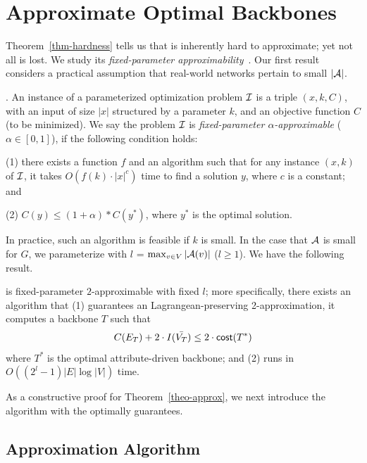 \vspace{-1ex}
\section{Approximate Optimal Backbones}
\label{sec-approx}

Theorem~\ref{thm-hardness} tells us that
\abd is inherently hard to approximate; yet
not all is lost. We
study its {\em fixed-parameter approximability}~\cite{marx2008parameterized}.
Our first result considers a practical
assumption that real-world networks pertain to
small $|\A|$.

.
An instance of a parameterized
optimization problem ${\cal I}$ is a triple $(x, k, C)$,
with an input of size $|x|$ structured by a parameter $k$, and an objective function $C$ (to be minimized).
We say the problem 
${\cal I}$ is {\em fixed-parameter $\alpha$-approximable} ($\alpha\in[0,1]$), if the following condition holds:

\sstab
(1) there exists a function $f$ and an algorithm such that for any instance $(x,k)$ of ${\cal I}$,
it takes $O(f(k)\cdot|x|^c)$ time to
find a solution $y$, where $c$ is a constant; and

\sstab
(2) $C(y)\leq (1+\alpha) * C(y^*)$,
where $y^*$ is the optimal solution.

\vspace{.5ex}
In practice, such an algorithm is feasible if
$k$ is small. In the case that
$\A$ is small
for $G$, we parameterize \abd with
$l$ = $\max_{v\in V}|\A(v)|$ ($l\geq 1$).
We have the following result.


\begin{theorem}
\label{theo-approx}
\abd is fixed-parameter $2$-approximable with fixed
$l$; more specifically, there exists an algorithm
that
(1) guarantees an Lagrangean-preserving 2-approximation,
\ie it computes a backbone $T$ such that
\[
C(E_T)+2\cdot I(\bar{V_T})\leq 2\cdot{\ensuremath {\mathsf{cost}}}(T^*)
\]
where $T^*$ is the optimal attribute-driven backbone;
and (2) runs in $O((2^{l}-1)|E|\log |V|)$ time.
\end{theorem}

As a constructive proof for Theorem~\ref{theo-approx},
we next introduce the algorithm with the optimally guarantees.


\subsection{Approximation Algorithm}

